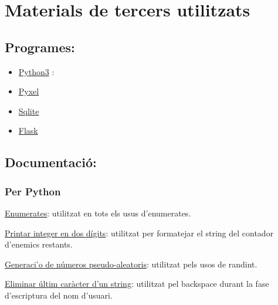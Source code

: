 
\section{Materials de tercers utilitzats}

\subsection{Programes:}
\begin{itemize}
\item{ \href{https://python.org/}{Python3} }:

\item{ \href{https://github.com/kitao/pyxel}{Pyxel} }
\item{ \href{https://sqlite.org/}{Sqlite} }
\item{ \href{https://github.com/pallets/flask}{Flask} }

\end{itemize}


\subsection{Documentaci\'o:}

\subsubsection*{Per Python}
\begin{itemize}
\begin{item}
\href{https://docs.python.org/3/library/enum.html}
{Enumerates}:
utilitzat en tots els usus d'enumerates.
\end{item}

\begin{item}
\href{https://stackoverflow.com/questions/64094654/python-converting-letter-to-two-digit-number}
{Printar integer en dos d\'igits}:
utilitzat per formatejar el string del contador d'enemics restants.
\end{item}

\begin{item}
\href{https://docs.python.org/3/library/random.html}
{Generaci'o de n\'umeros pseudo-aleatoris}:
utilitzat pels usos de randint.
\end{item}

\begin{item}
\href{https://stackoverflow.com/questions/15478127/remove-final-character-from-string}
{Eliminar \'ultim car\`acter d'un string}:
utilitzat pel backspace durant la fase d'escriptura del nom d'usuari.
\end{item}

\end{itemize}


